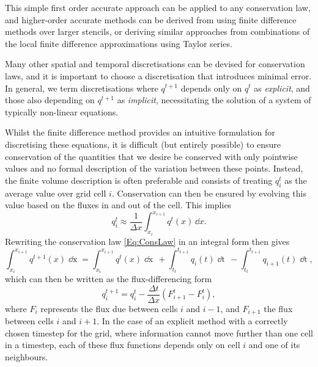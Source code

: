 This simple first order accurate approach can be applied to any conservation law, and higher-order accurate methods can be derived from using finite difference methods over larger stencils, or deriving similar approaches from combinations of the local finite difference approximations using Taylor series.

Many other spatial and temporal discretisations can be devised for conservation laws, and it is important to choose a discretisation that introduces minimal error.
In general, we term discretisations where $q^{t+1}$ depends only on $q^{t}$ as \emph{explicit}, and those also depending on $q^{t+1}$ as \emph{implicit}, necessitating the solution of a system of typically non-linear equations.

Whilst the finite difference method provides an intuitive formulation for discretising these equations, it is difficult (but entirely possible) to ensure conservation of the quantities that we desire be conserved with only pointwise values and no formal description of the variation between these points.
Instead, the finite volume description is often preferable and consists of treating $q_i^t$ as the average value over grid cell $i$.
Conservation can then be ensured by evolving this value based on the fluxes in and out of the cell.
This implies
\begin{equation}
    q_i^t \approx \frac{1}{\Delta x}\int_{x_i}^{x_{i+1}} q^t(x)\, \dd{}x.
\end{equation}
Rewriting the conservation law \eqref{Eq:ConsLaw} in an integral form then gives
\begin{equation}
    \int_{x_i}^{x_{i+1}} q^{t+1}(x) \mathop{\dd{}x} = \int_{x_i}^{x_{i+1}} q^{t}(x) \mathop{\dd{}x}
                                         \,+ \int_{t_t}^{t_{t+1}} q_i(t) \mathop{\dd{}t}
                                         \,- \int_{t_t}^{t_{t+1}} q_{i+1}(t) \mathop{\dd{}t},
\end{equation}
which can then be written as the flux-differencing form
\begin{equation}\label{Eq:FiniteVolumeMethod}
    q_i^{t+1} = q_i^t - \frac{\Delta t}{\Delta x}\left( F^t_{i+1} - F^t_{i} \right),
\end{equation}
where $F_i$ represents the flux due between cells $i$ and $i-1$, and $F_{i+1}$ the flux between cells $i$ and $i+1$.
In the case of an explicit method with a correctly chosen timestep for the grid, where information cannot move further than one cell in a timestep, each of these flux functions depends only on cell $i$ and one of its neighbours.
